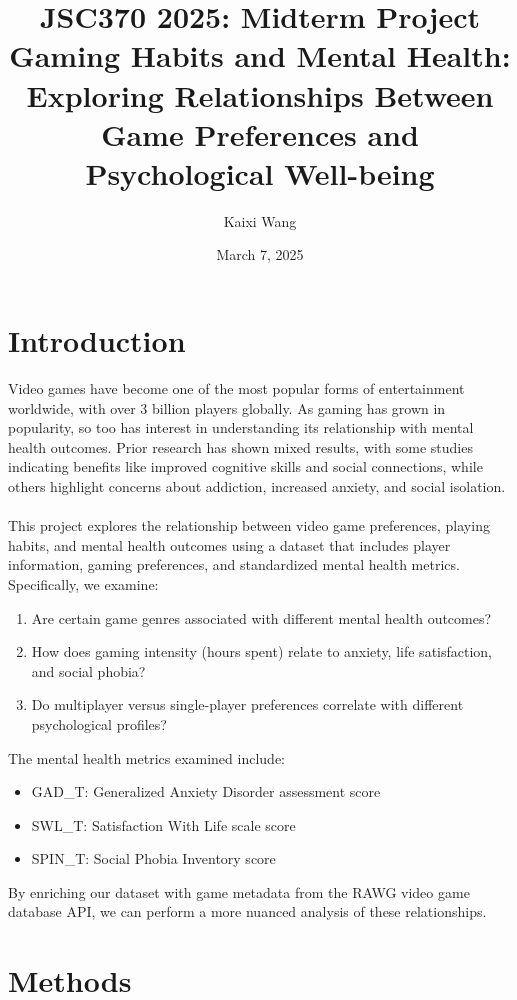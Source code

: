 \documentclass[12pt]{article}
\title{JSC370 2025: Midterm Project\\
Gaming Habits and Mental Health: Exploring Relationships Between Game Preferences and Psychological Well-being}
\author{Kaixi Wang}
\date{March 7, 2025}
\begin{document}
\maketitle

\section{Introduction}

Video games have become one of the most popular forms of entertainment worldwide, with over 3 billion players globally. As gaming has grown in popularity, so too has interest in understanding its relationship with mental health outcomes. Prior research has shown mixed results, with some studies indicating benefits like improved cognitive skills and social connections, while others highlight concerns about addiction, increased anxiety, and social isolation. \\
\\
This project explores the relationship between video game preferences, playing habits, and mental health outcomes using a dataset that includes player information, gaming preferences, and standardized mental health metrics. Specifically, we examine:

\begin{enumerate}
    \item Are certain game genres associated with different mental health outcomes?
    \item How does gaming intensity (hours spent) relate to anxiety, life satisfaction, and social phobia?
    \item Do multiplayer versus single-player preferences correlate with different psychological profiles?
\end{enumerate}

The mental health metrics examined include:
\begin{itemize}
    \item GAD\_T: Generalized Anxiety Disorder assessment score
    \item SWL\_T: Satisfaction With Life scale score
    \item SPIN\_T: Social Phobia Inventory score
\end{itemize}

\noindent
By enriching our dataset with game metadata from the RAWG video game database API, we can perform a more nuanced analysis of these relationships.

\section{Methods}
\end{document}
